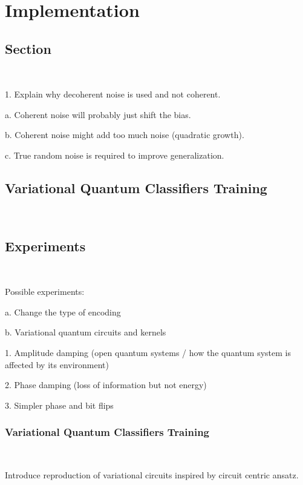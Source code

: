 \chapter{Implementation}\label{chapter:implementation}

\section{Section} \

1.	Explain why decoherent noise is used and not coherent. \

  a. Coherent noise will probably just shift the bias. \

  b. Coherent noise might add too much noise (quadratic growth). \

  c. True random noise is required to improve generalization. \


\section{Variational Quantum Classifiers Training}\label{section:vqc_training} \

\section{Experiments}\label{section:experiments} \

Possible experiments: \

a. Change the type of encoding \

b. Variational quantum circuits and kernels \

 1. Amplitude damping (open quantum systems / how the quantum system is affected by its environment) \

 2. Phase damping (loss of information but not energy) \

 3. Simpler phase and bit flips \

 \subsection{Variational Quantum Classifiers Training}\label{subsection:vqc_training} \

 Introduce reproduction of variational circuits inspired by circuit centric ansatz. \

